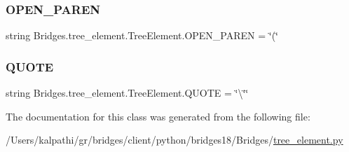 \subsubsection{\texorpdfstring{O\+P\+E\+N\+\_\+\+P\+A\+R\+EN}{OPEN\_PAREN}}
{\footnotesize\ttfamily string Bridges.\+tree\+\_\+element.\+Tree\+Element.\+O\+P\+E\+N\+\_\+\+P\+A\+R\+EN = \char`\"{}(\char`\"{}\hspace{0.3cm}{\ttfamily [static]}}

\mbox{\label{class_bridges_1_1tree__element_1_1_tree_element_af14308b7ca08bea361da3578def2fbd3}} 
\subsubsection{\texorpdfstring{Q\+U\+O\+TE}{QUOTE}}
{\footnotesize\ttfamily string Bridges.\+tree\+\_\+element.\+Tree\+Element.\+Q\+U\+O\+TE = \char`\"{}\textbackslash{}\char`\"{}\char`\"{}\hspace{0.3cm}{\ttfamily [static]}}



The documentation for this class was generated from the following file\+:\begin{DoxyCompactItemize}
\item 
/\+Users/kalpathi/gr/bridges/client/python/bridges18/\+Bridges/\mbox{\hyperlink{tree__element_8py}{tree\+\_\+element.\+py}}\end{DoxyCompactItemize}

